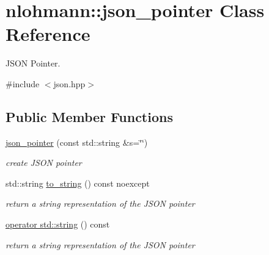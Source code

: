 \hypertarget{classnlohmann_1_1json__pointer}{}\section{nlohmann\+:\+:json\+\_\+pointer Class Reference}
\label{classnlohmann_1_1json__pointer}


J\+S\+ON Pointer.  




{\ttfamily \#include $<$json.\+hpp$>$}

\subsection*{Public Member Functions}
\begin{DoxyCompactItemize}
\item 
\hyperlink{classnlohmann_1_1json__pointer_a203910314c0be11c6b2b2cb53a9ad3aa}{json\+\_\+pointer} (const std\+::string \&s=\char`\"{}\char`\"{})
\begin{DoxyCompactList}\small\item\em create J\+S\+ON pointer \end{DoxyCompactList}\item 
std\+::string \hyperlink{classnlohmann_1_1json__pointer_a0920ebb015398813880e3c0f8464526e}{to\+\_\+string} () const noexcept
\begin{DoxyCompactList}\small\item\em return a string representation of the J\+S\+ON pointer \end{DoxyCompactList}\item 
\hyperlink{classnlohmann_1_1json__pointer_a63ea79682ed667584d498c901459873a}{operator std\+::string} () const 
\begin{DoxyCompactList}\small\item\em return a string representation of the J\+S\+ON pointer \end{DoxyCompactList}\end{DoxyCompactItemize}
